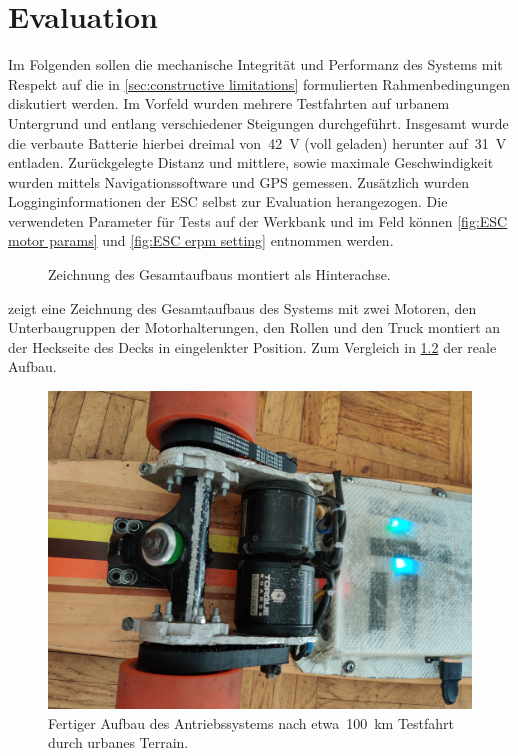 \chapter{Evaluation}
	Im Folgenden sollen die mechanische Integrität und Performanz des Systems mit Respekt auf die in \cref{sec:constructive limitations} formulierten Rahmenbedingungen diskutiert werden.
	Im Vorfeld wurden mehrere Testfahrten auf urbanem Untergrund und entlang verschiedener Steigungen durchgeführt.
	Insgesamt wurde die verbaute Batterie hierbei dreimal von~\qty{42}{\volt} (voll geladen) herunter auf~\qty{31}{\volt} entladen.
	Zurückgelegte Distanz und mittlere, sowie maximale Geschwindigkeit wurden mittels Navigationssoftware und GPS gemessen.
	Zusätzlich wurden Logginginformationen der ESC selbst zur Evaluation herangezogen.
	Die verwendeten Parameter für Tests auf der Werkbank und im Feld können \cref{fig:ESC motor params} und \cref{fig:ESC erpm setting} entnommen werden.

	\begin{figure}[h]
		\centering
		
		\caption[Zeichnung des Gesamtaufbaus]{Zeichnung des Gesamtaufbaus montiert als Hinterachse.}
		\label{fig:drivetrain inclined}
	\end{figure}

	 zeigt eine Zeichnung des Gesamtaufbaus des Systems mit zwei Motoren, den Unterbaugruppen der Motorhalterungen, den Rollen und den Truck montiert an der Heckseite des Decks in eingelenkter Position.
	Zum Vergleich in \cref{fig:real world assembly} der reale Aufbau.
	\begin{figure}[h]
		\centering
		\includegraphics[angle=180, width=.5\textwidth]{Footage/Pictures/Drivetrain close up v2.jpg}
		\caption[Fertiger Aufbau des Antriebssystems]{Fertiger Aufbau des Antriebssystems nach etwa~\qty{100}{\kilo\metre} Testfahrt durch urbanes Terrain.}
		\label{fig:real world assembly}
	\end{figure}
